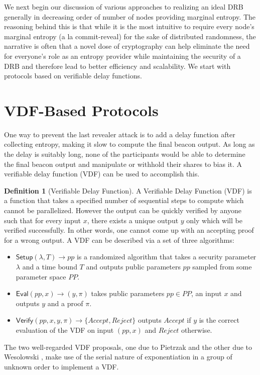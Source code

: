\documentclass[letterpaper,twocolumn,10pt]{article}
\theoremstyle{definition}
\newtheorem{definition}[theorem]{Definition}
\theoremstyle{remark}
\begin{document}
We next begin our discussion of various approaches to realizing an ideal DRB generally in decreasing order of number of nodes providing marginal entropy. The reasoning behind this is that while it is the most intuitive to require every node's marginal entropy (a la commit-reveal) for the sake of distributed randomness, the narrative is often that a novel dose of cryptography can help eliminate the need for everyone's role as an entropy provider while maintaining the security of a DRB and therefore lead to better efficiency and scalability. We start with protocols based on verifiable delay functions.

\section{VDF-Based Protocols}
\label{section:vdf}
One way to prevent the last revealer attack is to add a delay function after collecting entropy, making it slow to compute the final beacon output. As long as the delay is suitably long, none of the participants would be able to determine the final beacon output and manipulate or withhold their shares to bias it. A verifiable delay function (VDF) \cite{boneh2018verifiable} can be used to accomplish this.
\begin{definition}[Verifiable Delay Function]
A Verifiable Delay Function (VDF) is a function that takes a specified number of sequential steps to compute which cannot be parallelized. However the output can be quickly verified by anyone such that for every input $x$, there exists a unique output $y$ only which will be verified successfully. In other words, one cannot come up with an accepting proof for a wrong output.
A VDF can be described via a set of three algorithms:
\begin{itemize}
\item $\mathsf{Setup}(\lambda, T) \rightarrow pp$ is a randomized algorithm that takes a security parameter $\lambda$ and a time bound $T$  and outputs public parameters $pp$ sampled from some parameter space $PP$.
\item $\mathsf{Eval}(pp, x) \rightarrow (y, \pi)$ takes public parameters $pp\in PP$, an input $x$ and outputs $y$ and a proof $\pi$.
\item $\mathsf{Verify}(pp, x, y, \pi) \rightarrow \{Accept, Reject\}$ outputs $Accept$ if $y$ is the correct evaluation of the VDF on input $(pp, x)$ and $Reject$ otherwise.
\end{itemize}
\end{definition}
 The two well-regarded VDF proposals, one due to Pietrzak \cite{pietrzak2018simple} and the other due to Wesolowski \cite{wesolowski2019efficient}, make use of the serial nature of exponentiation in a group of unknown order to implement a VDF. 
\end{document}
